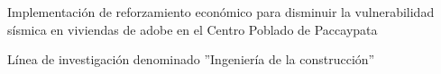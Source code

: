 \newpage
\pagestyle{plain}
\noindent Implementación de reforzamiento económico para disminuir la vulnerabilidad sísmica en viviendas de adobe en el Centro Poblado de Paccaypata\

\noindent Línea de investigación denominado ''Ingeniería de la construcción''
\doclicenseThis%
\newpage
	



